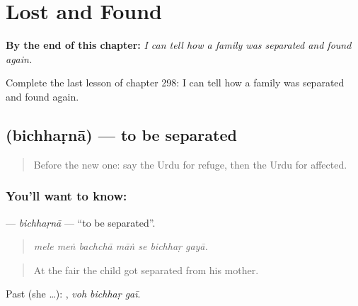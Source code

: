 
\chapter{Lost and Found}
\label{ch:ur-lost-and-found}

\begin{chapteropening}
\textbf{By the end of this chapter:} \emph{I can tell how a family was separated and found again.}

Complete the last lesson of chapter 298: I can tell how a family was separated and found again.
\end{chapteropening}

\section[\texorpdfstring{\ur{بچھڑنا} (bichhaṛnā)}{بچھڑنا (bichhaṛnā)}]{ (bichhaṛnā) — to be separated}

\label{lesson:UR-C298-bichharna}



\begin{quote}
Before the new one: say the Urdu for refuge, then the Urdu for affected.
\end{quote}

\subsection*{You'll want to know: }
\textbf{} — \emph{bichhaṛnā} — \textquotedblleft{}to be separated\textquotedblright{}.

\begin{quote}
      
\end{quote}

\begin{quote}
\emph{mele meṅ bachchā māṅ se bichhaṛ gayā.}
\end{quote}

\begin{quote}
At the fair the child got separated from his mother.
\end{quote}

Past (she …):   , \emph{voh bichhaṛ gaī}.

